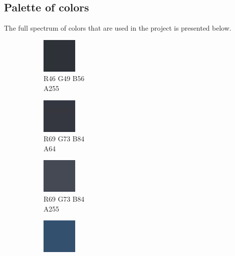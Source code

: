 \subsection{Palette of colors}
\noindent The full spectrum of colors that are used in the project is presented below.

\vspace*{-0.125cm}
\begin{figure}[!h]\label{gui-colors}\centering
	\captionsetup{justification=centering}
	\begin{subfigure}{0.105\textwidth}\centering
		\includegraphics[scale=1, frame]{gui-imgs/R46G49B56A255}
		\vspace*{-20px}\caption*{\hspace*{-0.25px}\tiny R46 G49 B56 \\ \tiny A255}
	\end{subfigure}
	\begin{subfigure}{0.105\textwidth}\centering
		\includegraphics[scale=1, frame]{gui-imgs/R69G73B84A64}
		\vspace*{-20px}\caption*{\hspace*{-0.25px}\tiny R69 G73 B84 \\ \tiny A64}
	\end{subfigure}
	\begin{subfigure}{0.105\textwidth}\centering
		\includegraphics[scale=1, frame]{gui-imgs/R69G73B84A255}
		\vspace*{-20px}\caption*{\hspace*{-0.25px}\tiny R69 G73 B84 \\ \tiny A255}
	\end{subfigure}
 	\begin{subfigure}{0.105\textwidth}\centering
		\includegraphics[scale=1, frame]{gui-imgs/R51G153B255A64}

\end{subfigure}
\end{figure}
